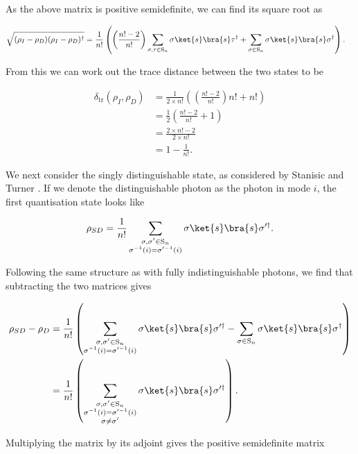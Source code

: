 \noindent As the above matrix is positive semidefinite, we can find its square root as

\begin{align}
\sqrt{(\rho_I - \rho_D)(\rho_I - \rho_D)^\dagger} &= \frac{1}{n!}\left(\left(\frac{n!-2}{n!}\right)\sum_{\sigma,\tau\in\textrm{S}_n}\sigma\ket{s}\bra{s}\tau^\dagger + \sum_{\sigma \in \textrm{S}_n}\sigma\ket{s}\bra{s}\sigma^\dagger\right).
\end{align}

\noindent From this we can work out the trace distance between the two states to be

\begin{align}
\delta_{\mathrm{tr}}(\rho_I, \rho_D) &= \frac{1}{2\times n!}\left(\left(\frac{n!-2}{n!}\right)n! + n!\right)\\
&= \frac{1}{2}\left(\frac{n!-2}{n!} + 1\right)\\
&= \frac{2 \times n! - 2}{2 \times n!}\\
&= 1 - \frac{1}{n!}.
\end{align}

We next consider the singly distinguishable state, as considered by Stanisic and Turner \cite{stanisic2018}. If we denote the distinguishable photon as the photon in mode $i$, the first quantisation state looks like

$$\rho_{SD} = \frac{1}{n!}\sum_{\substack{\sigma,\sigma'\in\textrm{S}_n\\\sigma^{-1}(i)=\sigma'^{-1}(i)}}\sigma\ket{s}\bra{s}\sigma'^\dagger.$$

\noindent Following the same structure as with fully indistinguishable photons, we find that subtracting the two matrices gives

\begin{align}
\rho_{SD} - \rho_D &= \frac{1}{n!}\left(\sum_{\substack{\sigma,\sigma'\in\textrm{S}_n\\\sigma^{-1}(i)=\sigma'^{-1}(i)}}\sigma\ket{s}\bra{s}\sigma'^\dagger - \sum_{\sigma \in \textrm{S}_n}\sigma\ket{s}\bra{s}\sigma^\dagger\right)\\
&= \frac{1}{n!}\left(\sum_{\substack{\sigma,\sigma'\in\textrm{S}_n\\\sigma^{-1}(i)=\sigma'^{-1}(i)\\\sigma\neq\sigma'}}\sigma\ket{s}\bra{s}\sigma'^\dagger\right).
\end{align}

\noindent Multiplying the matrix by its adjoint gives the positive semidefinite matrix

